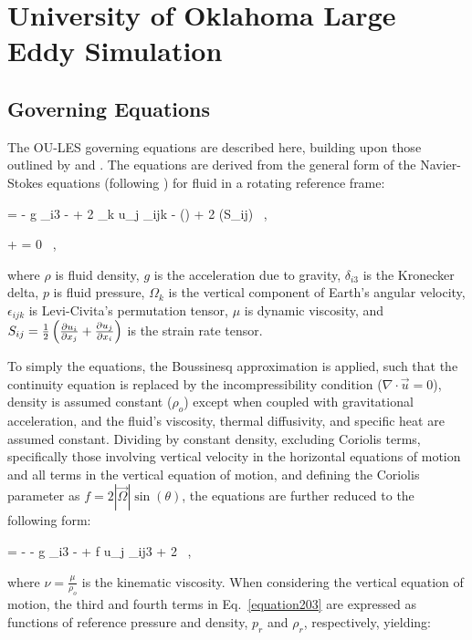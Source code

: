 \chapter{University of Oklahoma Large Eddy Simulation}
\label{les-2}

\section{Governing Equations}
\label{ge-21}

The OU-LES governing equations are described here, building upon those outlined by  \citet{Conzemius2004} and  \citet{Wilson2012a}. The equations are derived from the general form of the Navier-Stokes equations (following \citealt{Kundu}) for fluid in a rotating reference frame:


\be
\rho {} = - \rho g \delta_{i3} -  + 2 \rho \Omega_k u_j \epsilon_{ijk} - (\mu \nabla \cdot {}) + 2 (\mu S_{ij}) \, ,
\label{equation201}
\ee

\be
{}  +  = 0 \, ,
\label{equation202}
\ee


\noindent where $\rho$ is fluid density, $g$ is the acceleration due to gravity, $\delta_{i3}$ is the Kronecker delta, $p$ is fluid pressure, $\Omega_k$ is the vertical component of Earth's angular velocity, $\epsilon_{ijk}$ is Levi-Civita's permutation tensor, $\mu$ is dynamic viscosity, and $S_{ij} = \frac{1}{2}\left(\frac{\partial u_i}{\partial x_j} + \frac{\partial u_j}{\partial x_i}\right)$ is the strain rate tensor.

To simply the equations, the Boussinesq approximation is applied, such that the continuity equation is replaced by the incompressibility condition ($\nabla \cdot \vec{u} = 0$), density is assumed constant ($\rho_o$) except when coupled with gravitational acceleration, and the fluid's viscosity, thermal diffusivity, and specific heat are assumed constant. Dividing by constant density, excluding Coriolis terms, specifically those involving vertical velocity in the horizontal equations of motion and all terms in the vertical equation of motion, and defining the Coriolis parameter as $f = 2 \left|\vec{\Omega}\right|\sin (\theta)$, the equations are further reduced to the following form:


\be
{} = - -  g \delta_{i3} -   + f u_j \epsilon_{ij3} + 2 \nu {} \, ,
\label{equation203}
\ee


\noindent where $\nu = \frac{\mu}{\rho_o}$ is the kinematic viscosity. When considering the vertical equation of motion, the third and fourth terms in Eq.~\eqref{equation203} are expressed as functions of reference pressure and density, $p_r$ and $\rho_r$, respectively, yielding:


